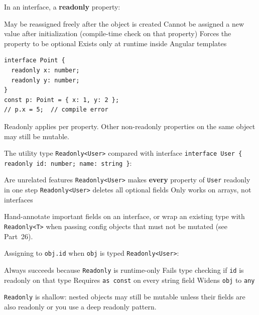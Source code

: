 \question[4]
In an interface, a \textbf{readonly} property:
\begin{choices}
  \choice May be reassigned freely after the object is created
  \CorrectChoice Cannot be assigned a new value after initialization (compile-time check on that property)
  \choice Forces the property to be optional
  \choice Exists only at runtime inside Angular templates
\end{choices}
\begin{solution}
\begin{lstlisting}[style=ts]
interface Point {
  readonly x: number;
  readonly y: number;
}
const p: Point = { x: 1, y: 2 };
// p.x = 5;  // compile error
\end{lstlisting}
  Readonly applies per property. Other non-readonly properties on the same object may still be mutable.
\end{solution}

\question[4]
The utility type \lstinline[style=tsinline]|Readonly<User>| compared with interface \lstinline[style=tsinline]|interface User { readonly id: number; name: string }|:
\begin{choices}
  \choice Are unrelated features
  \CorrectChoice \lstinline[style=tsinline]|Readonly<User>| makes \textbf{every} property of \lstinline[style=tsinline]|User| readonly in one step
  \choice \lstinline[style=tsinline]|Readonly<User>| deletes all optional fields
  \choice Only works on arrays, not interfaces
\end{choices}
\begin{solution}
  Hand-annotate important fields on an interface, or wrap an existing type with \lstinline[style=tsinline]|Readonly<T>| when passing config objects that must not be mutated (see Part~26).
\end{solution}

\question[4]
Assigning to \lstinline[style=tsinline]|obj.id| when \lstinline[style=tsinline]|obj| is typed \lstinline[style=tsinline]|Readonly<User>|:
\begin{choices}
  \choice Always succeeds because \lstinline[style=tsinline]|Readonly| is runtime-only
  \CorrectChoice Fails type checking if \lstinline[style=tsinline]|id| is readonly on that type
  \choice Requires \lstinline[style=tsinline]|as const| on every string field
  \choice Widens \lstinline[style=tsinline]|obj| to \lstinline[style=tsinline]|any|
\end{choices}
\begin{solution}
  \lstinline[style=tsinline]|Readonly| is shallow: nested objects may still be mutable unless their fields are also readonly or you use a deep readonly pattern.
\end{solution}

